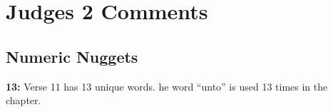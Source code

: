 \section{Judges 2 Comments}

\subsection{Numeric Nuggets}
\textbf{13: } Verse 11 has 13 unique words. he word ``unto'' is used 13 times in the chapter. 